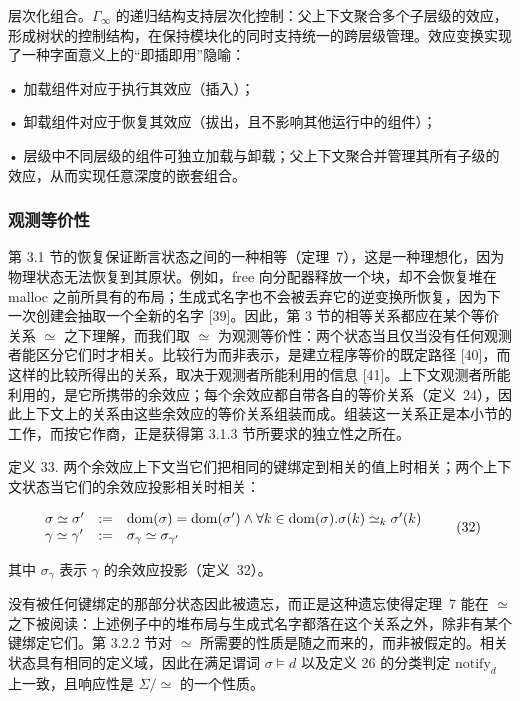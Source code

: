 \documentclass[
  10
]{article}
\begin{document}
层次化组合。\(\Gamma _ { \infty }\) 的递归结构支持层次化控制：父上下文聚合多个子层级的效应，形成树状的控制结构，在保持模块化的同时支持统一的跨层级管理。效应变换实现了一种字面意义上的“即插即用”隐喻：

• 加载组件对应于执行其效应（插入）；

• 卸载组件对应于恢复其效应（拔出，且不影响其他运行中的组件）；

• 层级中不同层级的组件可独立加载与卸载；父上下文聚合并管理其所有子级的效应，从而实现任意深度的嵌套组合。

\subsubsection{观测等价性} \label{observational-equivalence}

第 3.1 节的恢复保证断言状态之间的一种相等（定理~7），这是一种理想化，因为物理状态无法恢复到其原状。例如，free 向分配器释放一个块，却不会恢复堆在 malloc 之前所具有的布局；生成式名字也不会被丢弃它的逆变换所恢复，因为下一次创建会抽取一个全新的名字 [39]。因此，第 3 节的相等关系都应在某个等价关系 $\simeq$ 之下理解，而我们取 $\simeq$ 为观测等价性：两个状态当且仅当没有任何观测者能区分它们时才相关。比较行为而非表示，是建立程序等价的既定路径 [40]，而这样的比较所得出的关系，取决于观测者所能利用的信息 [41]。上下文观测者所能利用的，是它所携带的余效应；每个余效应都自带各自的等价关系（定义~24），因此上下文上的关系由这些余效应的等价关系组装而成。组装这一关系正是本小节的工作，而按它作商，正是获得第 3.1.3 节所要求的独立性之所在。

定义 33. 两个余效应上下文当它们把相同的键绑定到相关的值上时相关；两个上下文状态当它们的余效应投影相关时相关：

\[
\begin{array} { l l l } { { \sigma \simeq \sigma ^ { \prime } } } & { { : = } } & { { \mathrm { d o m } ( \sigma ) = \mathrm { d o m } ( \sigma ^ { \prime } ) \wedge \forall k \in \mathrm { d o m } ( \sigma ) . \sigma ( k ) \simeq _ { k } \sigma ^ { \prime } ( k ) } } \\ { { \gamma \simeq \gamma ^ { \prime } } } & { { : = } } & { { \sigma _ { \gamma } \simeq \sigma _ { \gamma ^ { \prime } } } } \end{array}\tag{32}
\]

其中 \(\sigma _ { \gamma }\) 表示 \(\gamma\) 的余效应投影（定义~32）。

没有被任何键绑定的那部分状态因此被遗忘，而正是这种遗忘使得定理~7 能在 $\simeq$ 之下被阅读：上述例子中的堆布局与生成式名字都落在这个关系之外，除非有某个键绑定它们。第 3.2.2 节对 $\simeq$ 所需要的性质是随之而来的，而非被假定的。相关状态具有相同的定义域，因此在满足谓词 \(\sigma \models d\) 以及定义 26 的分类判定 \(\mathrm { notify } _ { d }\) 上一致，且响应性是 \(\Sigma / \simeq\) 的一个性质。
\end{document}
